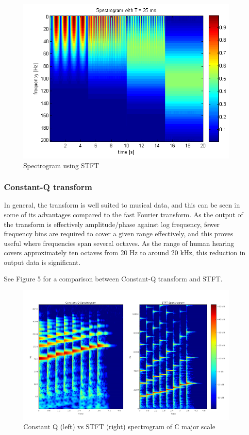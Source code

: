 \begin{figure}[h]
	\caption[Spectrogram using Short-Term Fourier Transform]{ Spectrogram using STFT \cite{stft_fig}}
	\centering
	\includegraphics[width=1\textwidth, height=\textheight, keepaspectratio]{"resources/STFT_spectrogram"}
\end{figure}


\subsubsection{Constant-Q transform}
In general, the transform is well suited to musical data, and this can be seen in some of its advantages compared to the fast Fourier transform. As the output of the transform is effectively amplitude/phase against log frequency, fewer frequency bins are required to cover a given range effectively, and this proves useful where frequencies span several octaves. As the range of human hearing covers approximately ten octaves from 20 Hz to around 20 kHz, this reduction in output data is significant. \cite{constant_q} \par
 See Figure 5 for a comparison between Constant-Q transform and STFT.


\begin{figure}[h]
	\caption[Constant Q vs STFT spectrogram of C major scale]{ Constant Q (left) vs STFT (right) spectrogram of C major scale}
	\centering
	\label{fig:cq_vs_stft}
	\includegraphics[width=1\textwidth, height=\textheight, keepaspectratio]{"resources/Q_vs_STFT"}
\end{figure}